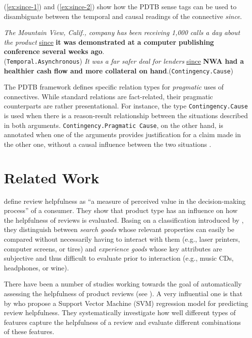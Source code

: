 \documentclass[
    a4paper,%
    12pt,%
    oneside,%
    toc=bibliography,
    final,
]{scrartcl}
\begin{document}
(\ref{ex:since-1}) and (\ref{ex:since-2}) \citep[from][4]{Prasad2008} show how the PDTB sense tags can be used to disambiguate between the temporal and causal readings of the connective \textit{since}.

\begin{exe}
\ex \label{ex:since-1} \textit{The Mountain View, Calif., company has been receiving 1,000 calls a day about the product} \underline{since} \textbf{it was demonstrated at a computer publishing conference several weeks ago}.\\
\hspace*{\fill}(\lstinline|Temporal.Asynchronous|)
\ex \label{ex:since-2} \textit{It was a far safer deal for lenders} \underline{since} \textbf{NWA had a healthier cash flow and more collateral on hand}.\hspace*{\fill}(\lstinline|Contingency.Cause|)
\end{exe}

The PDTB framework defines specific relation types for \textit{pragmatic} uses of connectives. While standard relations are fact-related, their pragmatic counterparts are rather presentational. For instance, the type \lstinline|Contingency.Cause| is used when there is a reason-result relationship between the situations described in both arguments. \lstinline|Contingency.Pragmatic Cause|, on the other hand, is annotated when one of the arguments provides justification for a claim made in the other one, without a causal influence between the two situations \citep[see][29]{Prasad2007}.

\section{Related Work}
\label{sec:related-work}

\citet[186]{MudambiSchuff2010} define review helpfulness as “a measure of perceived value in the decision-making process” of a consumer. They show that product type has an influence on how the helpfulness of reviews is evaluated. Basing on a classification introduced by \citet{Nelson1970}, they distinguish between \textit{search goods} whose relevant properties can easily be compared without necessarily having to interact with them (e.g., laser printers, computer screens, or tires) and \textit{experience goods} whose key attributes are subjective and thus difficult to evaluate prior to interaction (e.g., music CDs, headphones, or wine).

There have been a number of studies working towards the goal of automatically assessing the helpfulness of product reviews (see \citealt{Almagrabi2015}). A very influential one is that by \citet{Kim2006} who propose a Support Vector Machine (SVM) regression model for predicting review helpfulness. They systematically investigate how well different types of features capture the helpfulness of a review and evaluate different combinations of these features.
\end{document}
